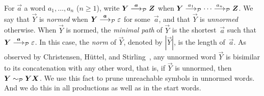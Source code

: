 For $\vec a$ a word $a_1,\dots, a_n$ ($n\ge1$), write
$\vec Y \LTSderivesP[\vec a] \vec Z$ when
$\vec Y \LTSderivesP[a_1] \cdots \LTSderivesP[a_n] \vec Z$.
%
We say that $\vec Y$ is \emph{normed} when
$\vec Y \LTSderivesP[\vec a] \varepsilon$ for some~$\vec a$, and that
$\vec Y$ is \emph{unnormed} otherwise.
%
When $\vec Y$ is normed, the \emph{minimal path} of $\vec Y$ is the
shortest~$\vec a$ such that $\vec Y \LTSderivesP[\vec a]
\varepsilon$.
%
In this case, the \emph{norm} of $\vec Y$, denoted by $|\vec Y|$, is
the length of~$\vec a$.
%
%
As observed by Christensen, H\"uttel, and
Stirling~\cite{DBLP:journals/iandc/ChristensenHS95}, any unnormed word
$\vec Y$ is bisimilar to its concatenation with any other word, that
is, if $\vec Y$ is unnormed, then $\vec Y \ProdEquiv \vec Y \vec X$.
We use this fact to prune unreachable symbols in unnormed words. And
we do this in all productions as well as in the start words.






